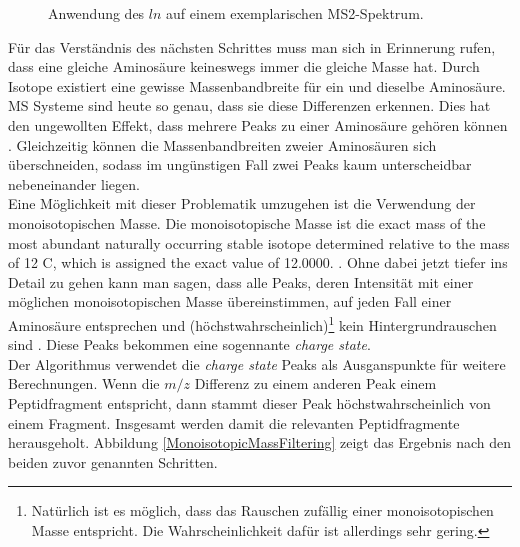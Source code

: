 \documentclass[a4paper, 12pt]{article}
\newcommand{\gerquot}[1]{\glqq#1\grqq}
\newcommand{\tikzScale}{1.0}
\newcommand{\massCharge}{$ m/z $ }
\begin{document}
\begin{figure}[H]
\begin{minipage}[t]{.45\linewidth}
      \end{minipage}
      \caption{Anwendung des $ ln $ auf einem exemplarischen MS2-Spektrum.}
\end{figure}

Für das Verständnis des nächsten Schrittes muss man sich in Erinnerung rufen, dass eine gleiche Aminosäure keineswegs immer die gleiche Masse hat. Durch Isotope existiert eine gewisse \gerquot{Massenbandbreite} für ein und dieselbe Aminosäure. MS Systeme sind heute so genau, dass sie diese Differenzen erkennen. Dies hat den ungewollten Effekt, dass mehrere Peaks zu einer Aminosäure gehören können \cite{IsotopicDistributionMS}. Gleichzeitig können die \gerquot{Massenbandbreiten} zweier Aminosäuren sich überschneiden, sodass im ungünstigen Fall zwei Peaks kaum unterscheidbar nebeneinander liegen.\\

Eine Möglichkeit mit dieser Problematik umzugehen ist die Verwendung der monoisotopischen Masse. Die monoisotopische Masse ist die \gerquot{[...] exact mass of the most abundant naturally occurring stable isotope determined relative to the mass of 12 C, which is assigned the exact value of 12.0000.} \cite{MonoisotopicMass}. Ohne dabei jetzt tiefer ins Detail zu gehen kann man sagen, dass alle Peaks, deren Intensität mit einer möglichen monoisotopischen Masse übereinstimmen, auf jeden Fall einer Aminosäure entsprechen und (höchstwahrscheinlich)\footnote{Natürlich ist es möglich, dass das Rauschen zufällig einer monoisotopischen Masse entspricht. Die Wahrscheinlichkeit dafür ist allerdings sehr gering.} kein Hintergrundrauschen sind \cite{MassDefectMS}. Diese Peaks bekommen eine sogennante \emph{charge state}.\\

Der Algorithmus verwendet die \emph{charge state} Peaks als Ausganspunkte für weitere Berechnungen. Wenn die \massCharge Differenz zu einem anderen Peak einem Peptidfragment entspricht, dann stammt dieser Peak höchstwahrscheinlich von einem Fragment. Insgesamt werden damit die relevanten Peptidfragmente herausgeholt. Abbildung \ref{MonoisotopicMassFiltering} zeigt das Ergebnis nach den beiden zuvor genannten Schritten.
\end{document}
